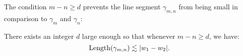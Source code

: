 %

The condition $m-n \geq d$ prevents the line segment $\gamma _{m,n}$ from being small in comparison to $\gamma_m$ and $\gamma_n$:
\begin{proposition} \label {case-3-proof} %
There exists an integer $d$ large enough so that whenever $m-n \geq d$, we have: 
	\begin{equation}
		\operatorname{Length}(\gamma_{m,n}) \lesssim |w_1-w_2|.
	\end{equation}
\end{proposition}

